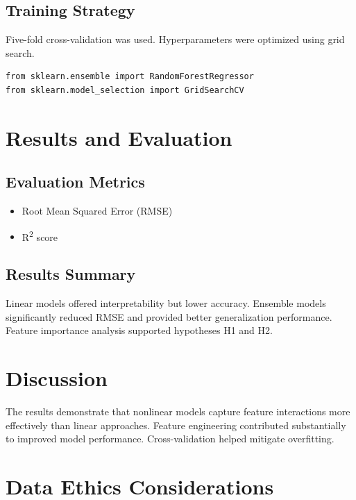 \documentclass[a4paper]{article}
\begin{document}
\subsection*{Training Strategy}

Five-fold cross-validation was used. Hyperparameters were optimized using grid search.

\begin{verbatim}
from sklearn.ensemble import RandomForestRegressor
from sklearn.model_selection import GridSearchCV
\end{verbatim}

\section*{Results and Evaluation}

\subsection*{Evaluation Metrics}

\begin{itemize}
    \item Root Mean Squared Error (RMSE)
    \item R\textsuperscript{2} score
\end{itemize}

\subsection*{Results Summary}

Linear models offered interpretability but lower accuracy. Ensemble models significantly reduced RMSE and provided better generalization performance. Feature importance analysis supported hypotheses H1 and H2.

\section*{Discussion}

The results demonstrate that nonlinear models capture feature interactions more effectively than linear approaches. Feature engineering contributed substantially to improved model performance. Cross-validation helped mitigate overfitting.

\section*{Data Ethics Considerations}
\end{document}

